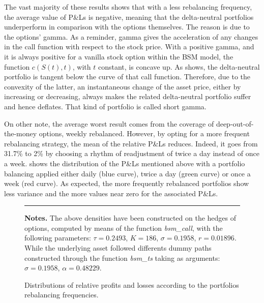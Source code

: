 \documentclass[12pt]{report}
\begin{document}
The vast majority of these results shows that with a less rebalancing frequency, the average value of P\&Ls is negative, meaning that the delta-neutral portfolios underperform in comparison with the options themselves. 
The reason is due to the options' gamma. 
As a reminder, gamma gives the acceleration of any changes in the call function with respect to the stock price.
With a positive gamma, and it is always positive for a vanilla stock option within the BSM model, the function $c(S(t), t)$, with $t$  constant, is concave up. 
As \citet{shreve} shows, the delta-neutral portfolio is tangent below the curve of that call function.
Therefore, due to the convexity of the latter, an instantaneous change of the asset price, either by increasing or decreasing, always makes the related delta-neutral portfolio suffer and hence deflates. 
That kind of portfolio is called short gamma.

















On other note, the average worst result comes from the coverage of deep-out-of-the-money options, weekly rebalanced.
However, by opting for a more frequent rebalancing strategy, the mean of the relative P\&Ls reduces.  
Indeed, it goes from 31.7\% to 2\% by choosing a rhythm of readjustment of twice a day instead of once a week.
 shows the distribution of the P\&Ls mentioned above with a portfolio balancing applied either daily (blue curve), twice a day (green curve) or once a week (red curve).
As expected, the more frequently rebalanced portfolios show less variance and the more values near zero for the associated P\&Ls.

\begin{figure}[h]
  \centering
  \rule{40mm}{20mm}
  \caption{Distributions of relative profits and losses according to the portfolios rebalancing frequencies.}
  \begin{changemargin}{0.5cm}{0.5cm}
  \medskip
\footnotesize
{}\textbf{Notes.} The above densities have been constructed on the hedges of options, computed by means of the function \textit{bsm\_call}, with the following parameters: $\tau = 0.2493$, $K = 186$, $\sigma = 0.1958$, $r = 0.01896$. While the underlying asset followed differents dummy paths constructed through the function \textit{bsm\_ts} taking as arguments: $\sigma = 0.1958$, $\alpha = 0.48229$.
  \end{changemargin}
  \label{p:analysis:gbm:pl:better}
\end{figure}
\end{document}

